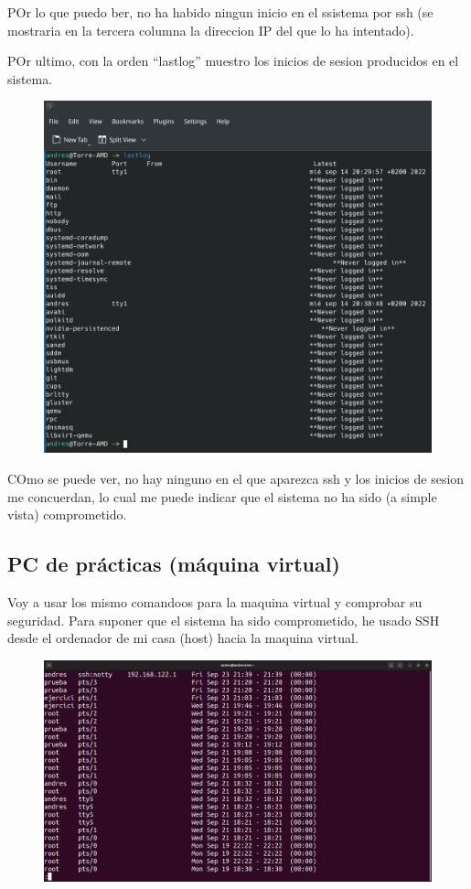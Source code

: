 \documentclass{article}
\begin{document}
POr lo que puedo ber, no ha habido ningun inicio en el ssistema por ssh (se mostraria en la tercera columna la direccion IP del que lo ha intentado).

POr ultimo, con la orden ``lastlog'' muestro los inicios de sesion producidos en el sistema.

\begin{figure}[H]
    \includegraphics[width=\textwidth]{imagenes/lastlogcasa.png}
\end{figure}

COmo se puede ver, no hay ninguno en el que aparezca ssh y los inicios de sesion me concuerdan, lo cual me puede indicar que el sistema no ha sido (a simple vista) comprometido.
\subsection{PC de prácticas (máquina virtual)}
Voy a usar los mismo comandoos para la maquina virtual y comprobar su seguridad. Para suponer que el sistema ha sido comprometido, he usado SSH desde el ordenador de mi casa (host) hacia la maquina virtual.

\begin{figure}[H]
    \includegraphics[width=\textwidth]{imagenes/lastbip.png}
\end{figure}
\end{document}
